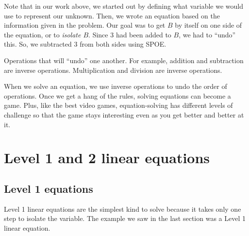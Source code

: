 Note that in our work above, we started out by defining what variable we would use to represent our unknown. Then, we wrote an equation based on the information given in the problem. Our goal was to get $B$ by itself on one side of the equation, or to \textit{isolate $B$}. Since 3 had been added to $B$, we had to ``undo'' this. So, we subtracted 3 from both sides using SPOE.

\begin{boxdef}
Operations that will ``undo'' one another. For example, addition and subtraction are inverse operations. Multiplication and division are inverse operations.
\end{boxdef}

When we solve an equation, we use inverse operations to undo the order of operations. Once we get a hang of the rules, solving equations can become a game. Plus, like the best video games, equation-solving has different levels of challenge so that the game stays interesting even as you get better and better at it.


\section{Level 1 and 2 linear equations}
\label{sec:linearlevels1and2}

\subsection{Level 1 equations}

Level 1 linear equations are the simplest kind to solve because it takes only one step to isolate the variable. The example we saw in the last section was a Level 1 linear equation.

